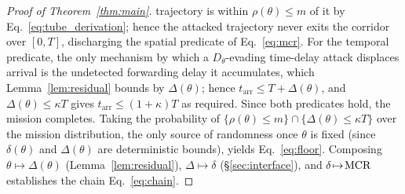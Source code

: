 \begin{proof}[Proof of Theorem~\ref{thm:main}]
trajectory is within $\rho(\theta)\le m$ of it by
Eq.~\eqref{eq:tube_derivation}; hence the attacked trajectory never exits the
corridor over $[0,T]$, discharging the spatial predicate of
Eq.~\eqref{eq:mcr}. For the temporal predicate, the only mechanism by
which a $D_\theta$-evading time-delay attack displaces arrival is the undetected
forwarding delay it accumulates, which Lemma~\ref{lem:residual} bounds by
$\Delta(\theta)$; hence $t_{\mathrm{arr}}\le T+\Delta(\theta)$, and
$\Delta(\theta)\le\kappa T$ gives $t_{\mathrm{arr}}\le(1+\kappa)T$ as required.
Since both predicates hold, the mission completes. Taking the probability of
$\{\rho(\theta)\le m\}\cap\{\Delta(\theta)\le\kappa T\}$ over the mission
distribution, the only source of randomness once $\theta$ is fixed (since
$\delta(\theta)$ and $\Delta(\theta)$ are deterministic bounds), yields
Eq.~\eqref{eq:floor}. Composing
$\theta\!\mapsto\!\Delta(\theta)$ (Lemma~\ref{lem:residual}),
$\Delta\!\mapsto\!\delta$ (\S\ref{sec:interface}), and $\delta\!\mapsto\!\mathrm{MCR}$
establishes the chain Eq.~\eqref{eq:chain}.
\end{proof}




